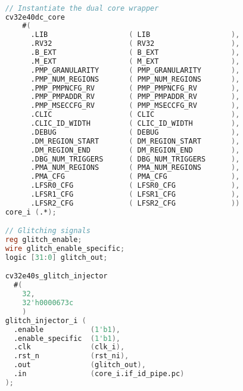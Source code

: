\begin{lstlisting}[caption={CV32E40DC wrapper code}, label=lst:dc_wrapper, language=verilog]

    // Instantiate the dual core wrapper 
    cv32e40dc_core
        #(
          .LIB                   ( LIB                   ),
          .RV32                  ( RV32                  ),
          .B_EXT                 ( B_EXT                 ),
          .M_EXT                 ( M_EXT                 ),
          .PMP_GRANULARITY       ( PMP_GRANULARITY       ),
          .PMP_NUM_REGIONS       ( PMP_NUM_REGIONS       ),
          .PMP_PMPNCFG_RV        ( PMP_PMPNCFG_RV        ),
          .PMP_PMPADDR_RV        ( PMP_PMPADDR_RV        ),
          .PMP_MSECCFG_RV        ( PMP_MSECCFG_RV        ),
          .CLIC                  ( CLIC                  ),
          .CLIC_ID_WIDTH         ( CLIC_ID_WIDTH         ),
          .DEBUG                 ( DEBUG                 ),
          .DM_REGION_START       ( DM_REGION_START       ),
          .DM_REGION_END         ( DM_REGION_END         ),
          .DBG_NUM_TRIGGERS      ( DBG_NUM_TRIGGERS      ),
          .PMA_NUM_REGIONS       ( PMA_NUM_REGIONS       ),
          .PMA_CFG               ( PMA_CFG               ),
          .LFSR0_CFG             ( LFSR0_CFG             ),
          .LFSR1_CFG             ( LFSR1_CFG             ),
          .LFSR2_CFG             ( LFSR2_CFG             ))
    core_i (.*);

    // Glitching signals 
    reg glitch_enable;
    wire glitch_enable_specific;
    logic [31:0] glitch_out;

    cv32e40s_glitch_injector 
      #(
        32,
        32'h0000673c
        )
    glitch_injector_i (
      .enable           (1'b1),
      .enable_specific  (1'b1),
      .clk              (clk_i),
      .rst_n            (rst_ni),
      .out              (glitch_out),
      .in               (core_i.if_id_pipe.pc)
    );

\end{lstlisting}

